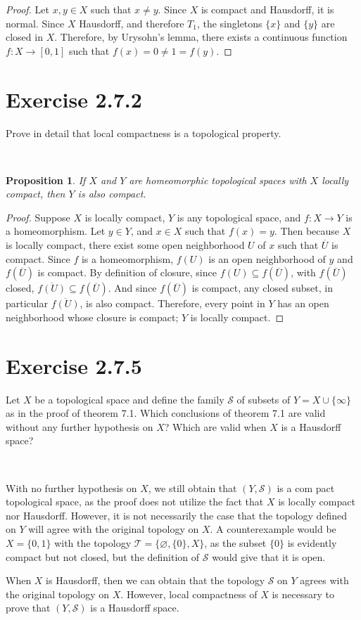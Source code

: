 \documentclass[12pt]{article}
\newtheorem{proposition}{Proposition}
\newenvironment{problem}
    {\begin{lrbox}{\mybox}\begin{minipage}{\textwidth-10pt}}
    {\end{minipage}\end{lrbox}\framebox[6.5in]{\usebox{\mybox}}\\}
\newcommand{\clo}[1]{\overline{#1}}
\let\emptyset\varnothing
\newcommand{\T}{\mathscr{T}}
\renewcommand{\S}{\mathscr{S}}
\begin{document}
\begin{proof}
    Let $x,y\in X$ such that $x\ne y$. Since $X$ is compact and Hausdorff, it is normal. Since $X$ Hausdorff, and therefore $T_1$, the singletons $\{x\}$ and $\{y\}$ are closed in $X$. Therefore, by Urysohn's lemma, there exists a continuous function $f:X\to[0,1]$ such that $f(x)=0\ne1=f(y)$. 
    
\end{proof}

\newpage
\section*{Exercise 2.7.2}
\begin{problem}
    Prove in detail that local compactness is a topological property.
\end{problem}

\begin{proposition}
    If $X$ and $Y$ are homeomorphic topological spaces with $X$ locally compact, then $Y$ is also compact.
\end{proposition}

\begin{proof}
    Suppose $X$ is locally compact, $Y$ is any topological space, and $f:X\to Y$ is a homeomorphism. Let $y\in Y$, and $x\in X$ such that $f(x)=y$. Then because $X$ is locally compact, there exist some open neighborhood $U$ of $x$ such that $\clo{U}$ is compact. Since $f$ is a homeomorphism, $f(U)$ is an open neighborhood of $y$ and $f(\clo{U})$ is compact. By definition of closure, since $f(U)\subseteq f(\clo{U})$, with $f(\clo{U})$ closed, $\clo{f(U)}\subseteq f(\clo{U})$. And since $f(\clo{U})$ is compact, any closed subset, in particular $\clo{f(U)}$, is also compact. Therefore, every point in $Y$ has an open neighborhood whose closure is compact; $Y$ is locally compact. 
    
\end{proof}

\section*{Exercise 2.7.5}
\begin{problem}
    Let $X$ be a topological space and define the family $\S$ of subsets of $Y= X \cup \{\infty\}$ as in the proof of theorem 7.1. Which conclusions of theorem 7.1 are valid without any further hypothesis on $X$? Which are valid when $X$ is a Hausdorff space?
\end{problem}

With no further hypothesis on $X$, we still obtain that $(Y,\S)$ is a com pact topological space, as the proof does not utilize the fact that $X$ is locally compact nor Hausdorff. However, it is not necessarily the case that the topology defined on $Y$ will agree with the original topology on $X$. A counterexample would be $X=\{0,1\}$ with the topology $\T = \{\emptyset, \{0\}, X\}$, as the subset $\{0\}$ is evidently compact but not closed, but the definition of $\S$ would give that it is open.

When $X$ is Hausdorff, then we can obtain that the topology $\S$ on $Y$ agrees with the original topology on $X$. However, local compactness of $X$ is necessary to prove that $(Y,\S)$ is a Hausdorff space.
\end{document}
